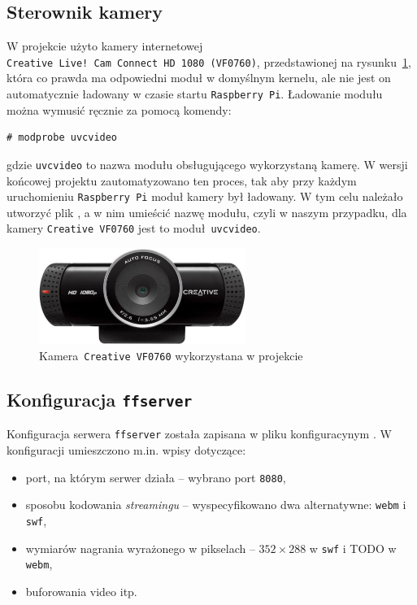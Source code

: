 \documentclass{article}
\begin{document}

\subsection{Sterownik kamery}

W projekcie użyto kamery internetowej \texttt{Creative~Live!~Cam~Connect~HD~1080~(VF0760)}, przedstawionej na rysunku~\ref{fig:creative}, która co prawda ma odpowiedni moduł w domyślnym kernelu, ale nie jest on automatycznie ładowany w czasie startu \texttt{Raspberry~Pi}. Ładowanie modułu można wymusić ręcznie za pomocą komendy:
\begin{verbatim}
# modprobe uvcvideo
\end{verbatim}
gdzie \texttt{uvcvideo} to nazwa modułu obsługującego wykorzystaną kamerę. W wersji końcowej projektu zautomatyzowano ten proces, tak aby przy każdym uruchomieniu \texttt{Raspberry~Pi} moduł kamery był ładowany. W tym celu należało utworzyć plik , a w nim umieścić nazwę modułu, czyli w naszym przypadku, dla kamery \texttt{Creative~VF0760} jest to moduł~\texttt{uvcvideo}.
\begin{figure}[h]
	\centering
	\includegraphics[width=0.6\textwidth]{img/creative}
	\caption{Kamera~\texttt{Creative~VF0760} wykorzystana w projekcie}
	\label{fig:creative}
\end{figure}


\subsection{Konfiguracja \texttt{ffserver}}

Konfiguracja serwera \texttt{ffserver} została zapisana w pliku konfiguracynym . W konfiguracji umieszczono m.in. wpisy dotyczące:
\begin{itemize}
	\item port, na którym serwer działa -- wybrano port \texttt{8080},
	\item sposobu kodowania \emph{streamingu} -- wyspecyfikowano dwa alternatywne: \texttt{webm} i \texttt{swf},
	\item wymiarów nagrania wyrażonego w pikselach -- $352\times288$ w \texttt{swf} i TODO w \texttt{webm},
	\item buforowania video itp.
\end{itemize}
\end{document}
